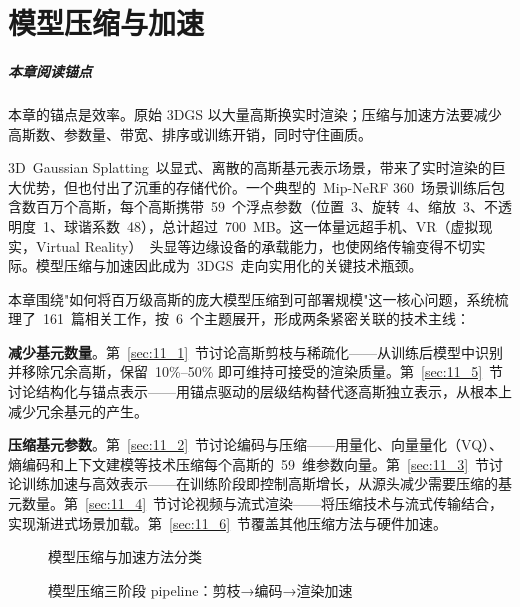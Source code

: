 \chapter{模型压缩与加速}
\label{ch:11}

\paragraph*{本章阅读锚点}
本章的锚点是效率。原始 3DGS 以大量高斯换实时渲染；压缩与加速方法要减少高斯数、参数量、带宽、排序或训练开销，同时守住画质。


3D~Gaussian Splatting~以显式、离散的高斯基元表示场景，带来了实时渲染的巨大优势，但也付出了沉重的存储代价。一个典型的~Mip-NeRF 360~场景训练后包含数百万个高斯，每个高斯携带~59~个浮点参数（位置~3、旋转~4、缩放~3、不透明度~1、球谐系数~48），总计超过~700~MB。这一体量远超手机、VR（虚拟现实，Virtual Reality）~头显等边缘设备的承载能力，也使网络传输变得不切实际。模型压缩与加速因此成为~3DGS~走向实用化的关键技术瓶颈。

本章围绕"如何将百万级高斯的庞大模型压缩到可部署规模"这一核心问题，系统梳理了~161~篇相关工作，按~6~个主题展开，形成两条紧密关联的技术主线：

\textbf{减少基元数量}。第~\ref{sec:11_1}~节讨论高斯剪枝与稀疏化——从训练后模型中识别并移除冗余高斯，保留~10\%--50\% 即可维持可接受的渲染质量。第~\ref{sec:11_5}~节讨论结构化与锚点表示——用锚点驱动的层级结构替代逐高斯独立表示，从根本上减少冗余基元的产生。

\textbf{压缩基元参数}。第~\ref{sec:11_2}~节讨论编码与压缩——用量化、向量量化（VQ）、熵编码和上下文建模等技术压缩每个高斯的~59~维参数向量。第~\ref{sec:11_3}~节讨论训练加速与高效表示——在训练阶段即控制高斯增长，从源头减少需要压缩的基元数量。第~\ref{sec:11_4}~节讨论视频与流式渲染——将压缩技术与流式传输结合，实现渐进式场景加载。第~\ref{sec:11_6}~节覆盖其他压缩方法与硬件加速。

\begin{figure}[htbp]
\centering
\resizebox{\textwidth}{!}{}
\caption{模型压缩与加速方法分类}
\label{fig:ch11_compression_taxonomy}
\end{figure}

\begin{figure}[htbp]
\centering
\resizebox{\textwidth}{!}{}
\caption{模型压缩三阶段 pipeline：剪枝→编码→渲染加速}
\label{fig:ch11_compression_pipeline}
\end{figure}

